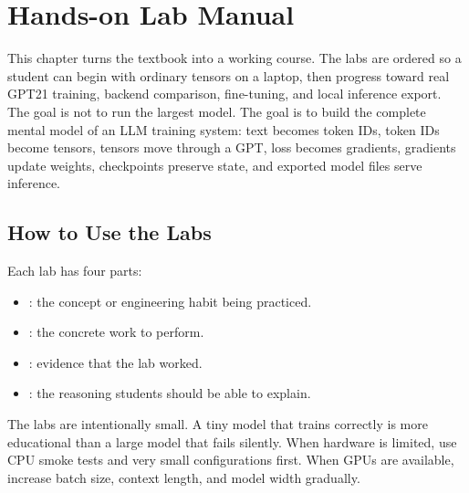 \chapter{Hands-on Lab Manual}

This chapter turns the textbook into a working course. The labs are ordered so a student can begin with ordinary tensors on a laptop, then progress toward real GPT21 training, backend comparison, fine-tuning, and local inference export. The goal is not to run the largest model. The goal is to build the complete mental model of an LLM training system: text becomes token IDs, token IDs become tensors, tensors move through a GPT, loss becomes gradients, gradients update weights, checkpoints preserve state, and exported model files serve inference.

\section{How to Use the Labs}

Each lab has four parts:

\begin{itemize}
  \item {}: the concept or engineering habit being practiced.
  \item {}: the concrete work to perform.
  \item {}: evidence that the lab worked.
  \item {}: the reasoning students should be able to explain.
\end{itemize}

The labs are intentionally small. A tiny model that trains correctly is more educational than a large model that fails silently. When hardware is limited, use CPU smoke tests and very small configurations first. When GPUs are available, increase batch size, context length, and model width gradually.

